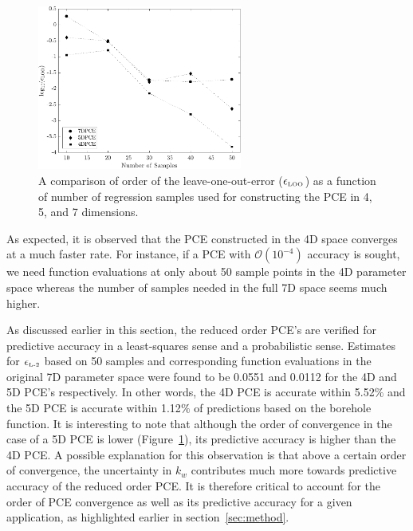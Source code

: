 \begin{figure}[htbp]
 \begin{center}
  \includegraphics[width=0.6\textwidth]{./Figures/err_samples_borehole}
\caption{A comparison of order of the leave-one-out-error 
($\epsilon_{\mbox{\tiny{LOO}}}$) as a function of number of regression samples
used for constructing the PCE in 4, 5, and 7 dimensions.}
\label{fig:conv_bore}
\end{center}
\end{figure}

\noindent As expected, it is observed that the PCE
constructed in the 4D space converges at a much faster rate. For instance, if a PCE with
$\mathcal{O}(10^{-4})$ accuracy is sought, we need function evaluations at only about
50 sample points in the 4D parameter space whereas the number of samples needed in the full 
7D space seems much higher. 

As discussed earlier in this section, the reduced order PCE's are verified for predictive accuracy in 
a least-squares sense and a probabilistic sense. Estimates for $\epsilon_{\mbox{\tiny{L-2}}}$
based on 50 samples and corresponding function evaluations in the original 7D parameter space
were found to be 0.0551 and 0.0112 for the 4D and 5D PCE's respectively. In other words, the 4D
PCE is accurate within 5.52$\%$ and the 5D PCE is accurate within 1.12$\%$ of predictions based on
the borehole function. It is interesting to note that although the order of convergence in the case of a 5D
PCE is lower (Figure~\ref{fig:conv_bore}), its predictive accuracy is higher than the 4D PCE. A possible
explanation for this observation is that above a certain order of convergence, the uncertainty in $k_w$ 
contributes much more towards predictive accuracy of the reduced order PCE. It is therefore critical
to account for the order of PCE convergence as well as its predictive accuracy for a given application,
as highlighted earlier in section~\ref{sec:method}. 

